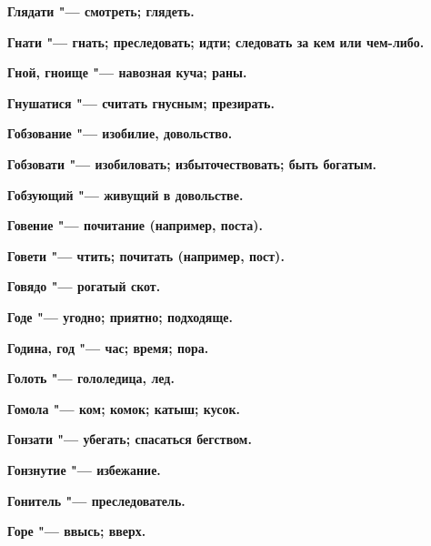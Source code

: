 \begin{mymulticols}{2}
\bfseries Глядати\normalfont{} "--- смотреть; глядеть. 




\bfseries Гнати\normalfont{} "--- гнать; преследовать; идти; следовать за кем или чем-либо. 




\bfseries Гной, гноище\normalfont{} "--- навозная куча; раны. 




\bfseries Гнушатися\normalfont{} "--- считать гнусным; презирать. 




\bfseries Гобзование\normalfont{} "--- изобилие, довольство. 




\bfseries Гобзовати\normalfont{} "--- изобиловать; избыточествовать; быть богатым. 




\bfseries Гобзующий\normalfont{} "--- живущий в довольстве. 




\bfseries Говение\normalfont{} "--- почитание (например, поста). 




\bfseries Говети\normalfont{} "--- чтить; почитать (например, пост). 




\bfseries Говядо\normalfont{} "--- рогатый скот. 




\bfseries Годе\normalfont{} "--- угодно; приятно; подходяще. 




\bfseries Година, год\normalfont{} "--- час; время; пора. 




\bfseries Голоть\normalfont{} "--- гололедица, лед. 




\bfseries Гомола\normalfont{} "--- ком; комок; катыш; кусок. 




\bfseries Гонзати\normalfont{} "--- убегать; спасаться бегством. 




\bfseries Гонзнутие\normalfont{} "--- избежание. 




\bfseries Гонитель\normalfont{} "--- преследователь. 




\bfseries Горе\normalfont{} "--- ввысь; вверх. 





\end{mymulticols}
